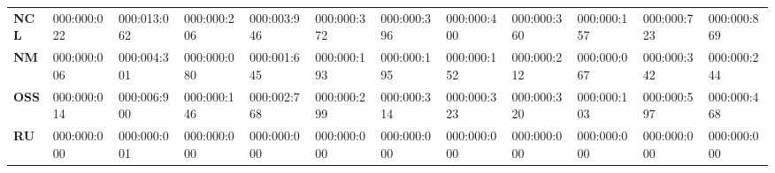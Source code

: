 {{\begin{tabular}{llllllllllll}
\textbf{NCL}                  & 000:000:022                                                                            & 000:013:062                                                                          & 000:000:206                         & 000:003:946                           & 000:000:372                                                                                      & 000:000:396                           & 000:000:400                           & 000:000:360                           & 000:000:157                            & 000:000:723                         & 000:000:869                                                                          \\
\textbf{NM}                   & 000:000:006                                                                            & 000:004:301                                                                          & 000:000:080                         & 000:001:645                           & 000:000:193                                                                                      & 000:000:195                           & 000:000:152                           & 000:000:212                           & 000:000:067                            & 000:000:342                         & 000:000:244                                                                          \\
\textbf{OSS}                  & 000:000:014                                                                            & 000:006:900                                                                          & 000:000:146                         & 000:002:768                           & 000:000:299                                                                                      & 000:000:314                           & 000:000:323                           & 000:000:320                           & 000:000:103                            & 000:000:597                         & 000:000:468                                                                          \\
\textbf{RU}                   & 000:000:000                                                                            & 000:000:001                                                                          & 000:000:000                         & 000:000:000                           & 000:000:000                                                                                      & 000:000:000                           & 000:000:000                           & 000:000:000                           & 000:000:000                            & 000:000:000                         & 000:000:000                                                                          \\

\end{tabular}}}
